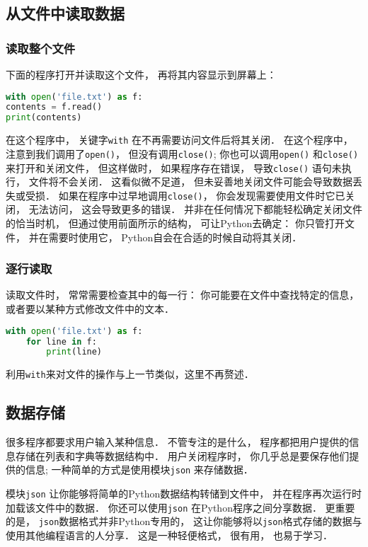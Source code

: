 \subsection{从文件中读取数据}
\subsubsection{读取整个文件}
下面的程序打开并读取这个文件， 再将其内容显示到屏幕上：
\begin{lstlisting}[language=python]
with open('file.txt') as f:
contents = f.read()
print(contents)
\end{lstlisting}
在这个程序中， 关键字\verb|with| 在不再需要访问文件后将其关闭． 在这个程序中， 注意到我们调用了\verb|open()|， 但没有调用\verb|close()|; 你也可以调用\verb|open()| 和\verb|close()| 来打开和关闭文件， 但这样做时， 如果程序存在错误， 导致\verb|close()| 语句未执行， 文件将不会关闭． 这看似微不足道， 但未妥善地关闭文件可能会导致数据丢失或受损． 如果在程序中过早地调用\verb|close()|， 你会发现需要使用文件时它已关闭， 无法访问， 这会导致更多的错误． 并非在任何情况下都能轻松确定关闭文件的恰当时机， 但通过使用前面所示的结构， 可让Python去确定： 你只管打开文件， 并在需要时使用它， Python自会在合适的时候自动将其关闭．

\subsubsection{逐行读取}
读取文件时， 常常需要检查其中的每一行： 你可能要在文件中查找特定的信息， 或者要以某种方式修改文件中的文本．
\begin{lstlisting}[language=python]
with open('file.txt') as f:
    for line in f:
        print(line)
\end{lstlisting}

利用\verb|with|来对文件的操作与上一节类似，这里不再赘述．

\subsection{数据存储}
很多程序都要求用户输入某种信息． 不管专注的是什么， 程序都把用户提供的信息存储在列表和字典等数据结构中．  用户关闭程序时， 你几乎总是要保存他们提供的信息; 一种简单的方式是使用模块\verb|json| 来存储数据．

模块\verb|json| 让你能够将简单的Python数据结构转储到文件中， 并在程序再次运行时加载该文件中的数据． 你还可以使用\verb|json| 在Python程序之间分享数据． 更重要的是， \verb|json|数据格式并非Python专用的， 这让你能够将以\verb|json|格式存储的数据与使用其他编程语言的人分享． 这是一种轻便格式， 很有用， 也易于学习．

